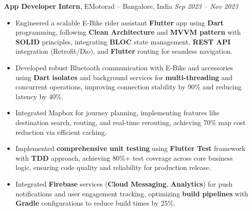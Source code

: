 \documentclass[10pt, letterpaper]{article}
\newenvironment{highlights}{
    \begin{itemize}[
        topsep=0.10 cm,
        parsep=0.10 cm,
        partopsep=0pt,
        itemsep=0.05cm, %
        leftmargin=10pt, %
        labelwidth=!, %
        labelsep=5pt %
    ]\justifying %
}{
    \end{itemize}
}
\newenvironment{onecolentry}{
    \begin{adjustwidth}{0cm}{0cm} %
    \RaggedRight %
}{
    \end{adjustwidth}
}
\begin{document}
    \begin{onecolentry}
        \textbf{App Developer Intern}, EMotorad -- Bangalore, India \hfill \textit{Sep 2023 – Nov 2023}
        \vspace{0.10 cm}
        \begin{highlights}
            \item Engineered a scalable E-Bike rider assistant \textbf{Flutter} app using \textbf{Dart} programming, following \textbf{Clean Architecture} and \textbf{MVVM pattern} with \textbf{SOLID} principles, integrating \textbf{BLOC} state management, \textbf{REST API} integration (Retrofit/Dio), and \textbf{Flutter} routing for seamless navigation. %
            \item Developed robust Bluetooth communication with E-Bike and accessories using \textbf{Dart isolates} and background services for \textbf{multi-threading} and concurrent operations, improving connection stability by 90\% and reducing latency by 40\%.
            \item Integrated Mapbox for journey planning, implementing features like destination search, routing, and real-time rerouting, achieving 70\% map cost reduction via efficient caching. %
                    \item Implemented \textbf{comprehensive unit testing} using \textbf{Flutter Test} framework with \textbf{TDD} approach, achieving 80\%+ test coverage across core business logic, ensuring code quality and reliability for production release.
                    \item Integrated \textbf{Firebase} services (\textbf{Cloud Messaging}, \textbf{Analytics}) for push notifications and user engagement tracking, optimizing \textbf{build pipelines} with \textbf{Gradle} configurations to reduce build times by 25\%.
        \end{highlights}
    \end{onecolentry}
    \vspace{0.2 cm}
\end{document}
